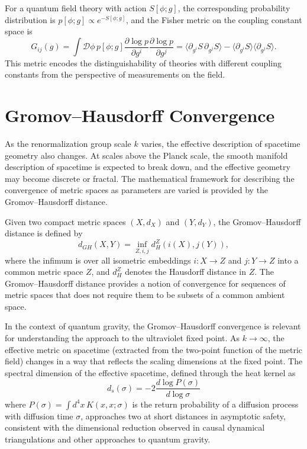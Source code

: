 \documentclass[11pt, twoside, openright]{book}
\theoremstyle{dotted}
\theoremstyle{definition}
\begin{document}
For a quantum field theory with action $S[\phi; g]$, the corresponding probability
distribution is $p[\phi; g] \propto e^{-S[\phi; g]}$, and the Fisher metric on the
coupling constant space is
\begin{equation}
  G_{ij}(g) = \int \mathcal{D}\phi \, p[\phi; g]
  \frac{\partial\log p}{\partial g^i}\frac{\partial\log p}{\partial g^j}
  = \langle\partial_{g^i}S \, \partial_{g^j}S\rangle - \langle\partial_{g^i}S\rangle
  \langle\partial_{g^j}S\rangle.
  \label{eq:qft_fisher}
\end{equation}
This metric encodes the distinguishability of theories with different coupling
constants from the perspective of measurements on the field.

\section{Gromov--Hausdorff Convergence}

As the renormalization group scale $k$ varies, the effective description of
spacetime geometry also changes. At scales above the Planck scale, the smooth
manifold description of spacetime is expected to break down, and the effective
geometry may become discrete or fractal. The mathematical framework for describing
the convergence of metric spaces as parameters are varied is provided by the
Gromov--Hausdorff distance.

Given two compact metric spaces $(X, d_X)$ and $(Y, d_Y)$, the Gromov--Hausdorff
distance is defined by
\begin{equation}
  d_{GH}(X, Y) = \inf_{Z, i, j} d_H^Z(i(X), j(Y)),
  \label{eq:gromov_hausdorff}
\end{equation}
where the infimum is over all isometric embeddings $i: X \to Z$ and $j: Y \to Z$
into a common metric space $Z$, and $d_H^Z$ denotes the Hausdorff distance in $Z$.
The Gromov--Hausdorff distance provides a notion of convergence for sequences of
metric spaces that does not require them to be subsets of a common ambient space.

In the context of quantum gravity, the Gromov--Hausdorff convergence is relevant
for understanding the approach to the ultraviolet fixed point. As $k \to \infty$,
the effective metric on spacetime (extracted from the two-point function of the
metric field) changes in a way that reflects the scaling dimensions at the fixed
point. The spectral dimension of the effective spacetime, defined through the heat
kernel as
\begin{equation}
  d_s(\sigma) = -2\frac{d\log P(\sigma)}{d\log\sigma}
  \label{eq:spectral_dimension}
\end{equation}
where $P(\sigma) = \int d^4x \, K(x,x;\sigma)$ is the return probability of a
diffusion process with diffusion time $\sigma$, approaches two at short distances
in asymptotic safety, consistent with the dimensional reduction observed in causal
dynamical triangulations and other approaches to quantum gravity.
\end{document}
